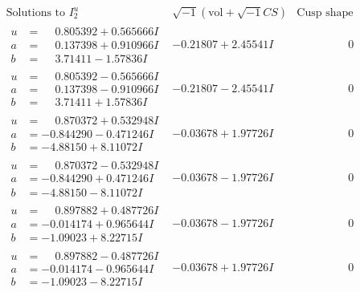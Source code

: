 \documentclass[1p]{elsarticle_modified}
\theoremstyle{definition}
\newcommand{\I}{\sqrt{-1}}
\begin{document}
$$\begin{array}{c|c|c}  
\text{Solutions to }I^u_{2}& \I (\text{vol} + \sqrt{-1}CS) & \text{Cusp shape}\\
 \hline 
\begin{aligned}
u &= \phantom{-}0.805392 + 0.565666 I \\
a &= \phantom{-}0.137398 + 0.910966 I \\
b &= \phantom{-}3.71411 - 1.57836 I\end{aligned}
 & -0.21807 + 2.45541 I & \phantom{-0.000000 } 0 \\ \hline\begin{aligned}
u &= \phantom{-}0.805392 - 0.565666 I \\
a &= \phantom{-}0.137398 - 0.910966 I \\
b &= \phantom{-}3.71411 + 1.57836 I\end{aligned}
 & -0.21807 - 2.45541 I & \phantom{-0.000000 } 0 \\ \hline\begin{aligned}
u &= \phantom{-}0.870372 + 0.532948 I \\
a &= -0.844290 - 0.471246 I \\
b &= -4.88150 + 8.11072 I\end{aligned}
 & -0.03678 + 1.97726 I & \phantom{-0.000000 } 0 \\ \hline\begin{aligned}
u &= \phantom{-}0.870372 - 0.532948 I \\
a &= -0.844290 + 0.471246 I \\
b &= -4.88150 - 8.11072 I\end{aligned}
 & -0.03678 - 1.97726 I & \phantom{-0.000000 } 0 \\ \hline\begin{aligned}
u &= \phantom{-}0.897882 + 0.487726 I \\
a &= -0.014174 + 0.965644 I \\
b &= -1.09023 + 8.22715 I\end{aligned}
 & -0.03678 - 1.97726 I & \phantom{-0.000000 } 0 \\ \hline\begin{aligned}
u &= \phantom{-}0.897882 - 0.487726 I \\
a &= -0.014174 - 0.965644 I \\
b &= -1.09023 - 8.22715 I\end{aligned}
 & -0.03678 + 1.97726 I & \phantom{-0.000000 } 0 \\ \hline\begin{aligned}

\end{aligned}
\end{array}$$
\end{document}
